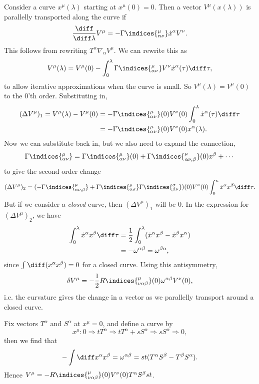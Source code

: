 \documentclass[12pt]{article}
\begin{document}
Consider a curve $x^\mu(\lambda)$ starting at $x^\mu(0) = 0$. Then a vector $V^\mu(x(\lambda))$ is parallelly transported along the curve if
\[
\frac{\diff}{\diff \lambda} V^\mu = - \Gamma\indices{^{\mu}_{\alpha\nu}} \dot x^\alpha V^\nu.
\]
This follows from rewriting $T^\alpha \nabla_\alpha V^\mu$. We can rewrite this as
\[
V^\mu(\lambda) = V^\mu(0) - \int_0^\lambda \Gamma\indices{^{\mu}_{\alpha\nu}}V^\nu \dot x^\alpha(\tau) \diff \tau,
\]
to allow iterative approximations when the curve is small. So $V^\mu(\lambda) = V^\mu(0)$ to the 0'th order. Substituting in,
\begin{align*}
	(\Delta V^\mu)_1 = V^\mu(\lambda) - V^\mu(0) &= - \Gamma\indices{^{\mu}_{\alpha\nu}}(0) V^\nu(0) \int_0^\lambda \dot x^\alpha (\tau) \diff \tau \\
						     &= - \Gamma \indices{^{\mu}_{\alpha\nu}}(0) V^\nu(0) x^\alpha(\lambda).
\end{align*}
Now we can substitute back in, but we also need to expand the connection,
\[
\Gamma\indices{^{\mu}_{\alpha\nu}} = \Gamma\indices{^{\mu}_{\alpha\nu}}(0) + \Gamma\indices{^{\mu}_{\alpha \nu,\beta}}(0) x^\beta + \cdots
\]
to give the second order change
\[
	(\Delta V^\mu)_2 = (- \Gamma\indices{^{\mu}_{\alpha\nu,\beta}} + \Gamma\indices{^{\mu}_{\alpha\sigma}}\Gamma\indices{^{\sigma}_{\beta\nu}})(0) V^\nu(0) \int_0^\kappa \dot x^\alpha x^\beta \diff \tau.
\]
But if we consider a \emph{closed} curve, then $(\Delta V^\mu)_1$ will be $0$. In the expression for $(\Delta V^\mu)_2$, we have
\begin{align*}
	\int_0^\lambda \dot x^\alpha x^\beta \diff \tau &= \frac{1}{2} \int_0^\lambda (\dot x^\alpha x^\beta - \dot x^\beta x^\alpha) \\
							&= - \omega^{\alpha\beta} = \omega^{\beta\alpha},
\end{align*}
since $\int \diff (x^\alpha x^\beta) = 0$ for a closed curve. Using this antisymmetry,
\[
\delta V^\mu = - \frac{1}{2} R\indices{^{\mu}_{\nu\alpha\beta}}(0) \omega^{\alpha\beta} V^\nu(0),
\]
i.e. the curvature gives the change in a vector as we parallelly transport around a closed curve.

\begin{exbox}
	Fix vectors $T^\alpha$ and $S^\alpha$ at $x^\mu = 0$, and define a curve by
	\[
	x^\mu : 0 \Rightarrow t T^\alpha \Rightarrow t T^\alpha + s S^\alpha \Rightarrow s S^\alpha \Rightarrow 0,
	\]
	then we find that
	\[
	- \int \diff x^\alpha x^\beta = \omega^{\alpha\beta} = st (T^\alpha S^\beta - T^\beta S^\alpha).
	\]
	Hence $V^\mu = - R\indices{^{\mu}_{\nu\alpha\beta}}(0) V^\nu(0) T^\alpha S^\beta st$.
\end{exbox}
\end{document}
